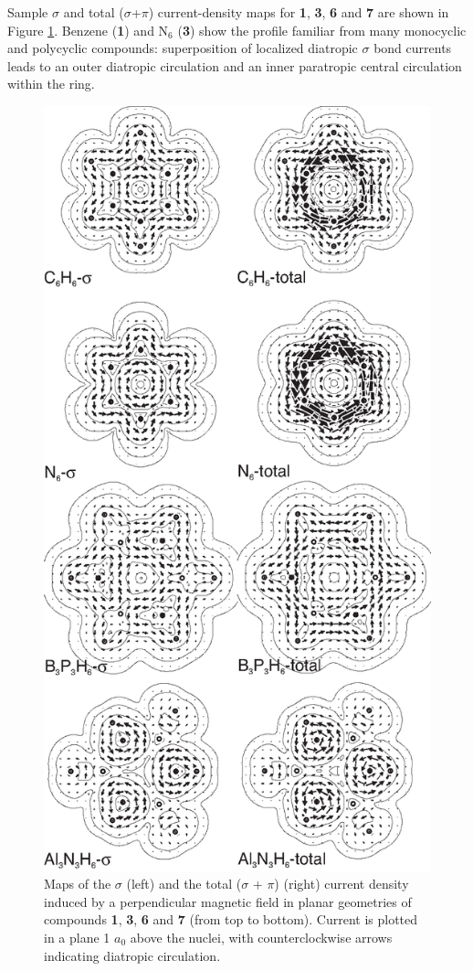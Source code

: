 Sample $\sigma$ and total ($\sigma$+$\pi$) current-density maps for
\textbf{1}, \textbf{3}, \textbf{6} and \textbf{7} are shown in Figure \ref{ch6.figure4}.
Benzene (\textbf{1}) and N$_6$ (\textbf{3}) show the
profile familiar from many monocyclic and polycyclic compounds: superposition
of localized diatropic $\sigma$ bond currents leads to an outer diatropic
circulation and an inner paratropic central circulation within the ring.
\begin{figure}[htbp]
\center
\includegraphics[scale=0.9]{inorganic/figures/figure4.eps}
\caption{Maps of the $\sigma$ (left) and the total ($\sigma$ + $\pi$) (right)
current density induced by a perpendicular magnetic field in planar geometries of
compounds \textbf{1}, \textbf{3}, \textbf{6} and \textbf{7} (from top to bottom). Current
is plotted in a plane 1 $a_{0}$ above the nuclei, with counterclockwise arrows
indicating diatropic circulation.}
\label{ch6.figure4}
\end{figure}
